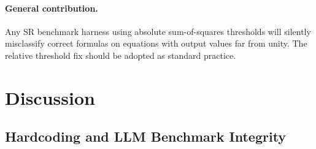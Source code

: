 \documentclass[twoside,11pt]{article}
\begin{document}
\paragraph{General contribution.}
Any SR benchmark harness using absolute sum-of-squares thresholds will
silently misclassify correct formulas on equations with output values far
from unity.  The relative threshold fix should be adopted as standard practice.

\section{Discussion}
\label{suppb:discussion}

\subsection{Hardcoding and LLM Benchmark Integrity}
\end{document}
